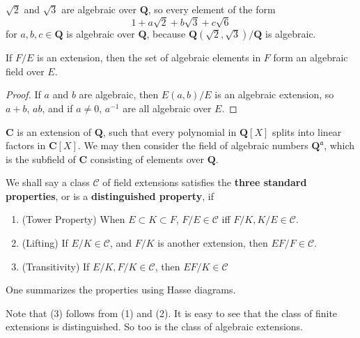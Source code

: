\begin{example}
    $\sqrt{2}$ and $\sqrt{3}$ are algebraic over $\mathbf{Q}$, so every element of the form
    \[ 1 + a \sqrt{2} + b \sqrt{3} + c \sqrt{6} \]
    for $a,b,c \in \mathbf{Q}$ is algebraic over $\mathbf{Q}$, because $\mathbf{Q}(\sqrt{2},\sqrt{3})/\mathbf{Q}$ is algebraic.
\end{example}

\begin{theorem}
    If $F/E$ is an extension, then the set of algebraic elements in $F$ form an algebraic field over $E$.
\end{theorem}
\begin{proof}
    If $a$ and $b$ are algebraic, then $E(a,b)/E$ is an algebraic extension, so $a + b$, $ab$, and if $a \neq 0$, $a^{-1}$ are all algebraic over $E$.
\end{proof}

\begin{example}
    $\mathbf{C}$ is an extension of $\mathbf{Q}$, such that every polynomial in $\mathbf{Q}[X]$ splits into linear factors in $\mathbf{C}[X]$. We may then consider the field of algebraic numbers $\mathbf{Q}^{\mathfrak{a}}$, which is the subfield of $\mathbf{C}$ consisting of elements over $\mathbf{Q}$.
\end{example}

We shall say a class $\mathcal{C}$ of field extensions satisfies the {\bf three standard properties}, or is a {\bf distinguished property}, if
%
\begin{enumerate}
    \item (Tower Property) When $E \subset K \subset F$, $F/E \in \mathcal{C}$ iff $F/K,K/E \in \mathcal{C}$.
    \item (Lifting) If $E/K \in \mathcal{C}$, and $F/K$ is another extension, then $EF/F \in \mathcal{C}$.
    \item (Transitivity) If $E/K, F/K \in \mathcal{C}$, then $EF/K \in \mathcal{C}$
\end{enumerate}
%
One summarizes the properties using Hasse diagrams.
%
\begin{center}
\end{center}
%
Note that (3) follows from (1) and (2). It is easy to see that the class of finite extensions is distinguished. So too is the class of algebraic extensions.

